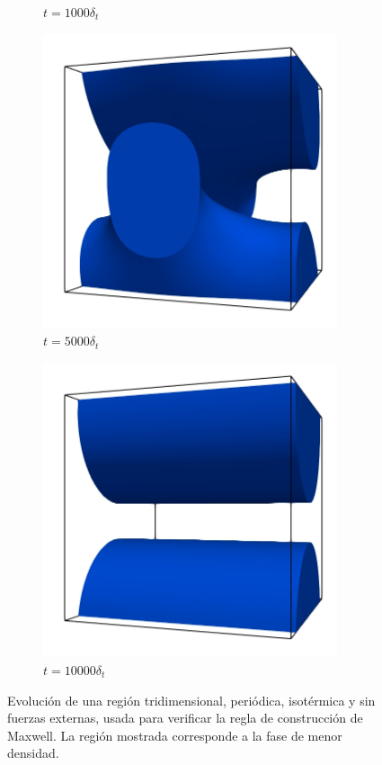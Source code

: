\begin{figure}[htb]
\begin{subfigure}[t]{0.45\textwidth}
        \caption{$t = 1000 \delta_t$}
    \end{subfigure}    
    \begin{subfigure}[t]{0.45\textwidth}
        \centering
        \includegraphics[width=0.95\textwidth]{Imagenes/Maxwell3D/Maxwell3D_sim/Imagenes/t_5000}
        \caption{$t = 5000 \delta_t$}
    \end{subfigure}
    \begin{subfigure}[t]{0.45\textwidth}
        \centering
        \includegraphics[width=0.95\textwidth]{Imagenes/Maxwell3D/Maxwell3D_sim/Imagenes/t_10000}
        \caption{$t = 10000 \delta_t$}
    \end{subfigure}        
    \caption{Evoluci\'on de una regi\'on tridimensional, peri\'odica, isot\'ermica y sin fuerzas externas, usada para verificar la regla de construcci\'on de Maxwell. La regi\'on mostrada corresponde a la fase de menor densidad.}
    \label{fig:maxwell_3d}
\end{figure}
